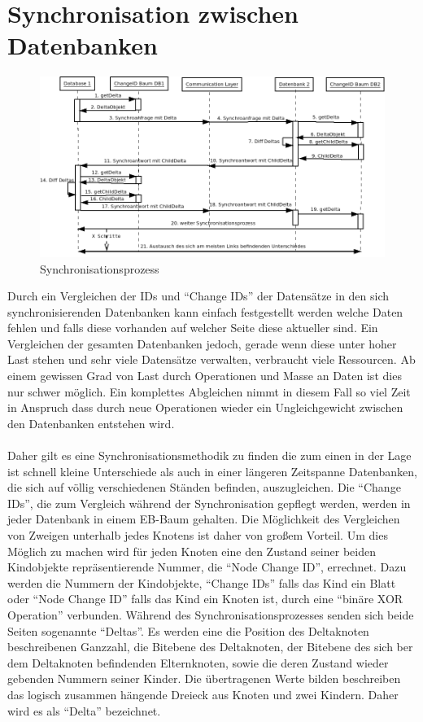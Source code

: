 \documentclass[a4paper,11pt,oneside,%
headsepline,												%
footsepline,												%
bibtotocnumbered									%
]{scrreprt}
\begin{document}
\section{Synchronisation zwischen Datenbanken}
\label{sec:eBTreeSynchronisation}
\begin{figure}[h!]
 	\centering
    \includegraphics[width=1\textwidth]{bilder/SynchroProzess.png}
    \caption{Synchronisationsprozess}
\end{figure}
Durch ein Vergleichen der \ac{ID}s und \enquote{Change IDs} der Datensätze in den sich synchronisierenden Datenbanken kann einfach festgestellt werden welche Daten fehlen und falls diese vorhanden auf welcher Seite diese aktueller sind. Ein Vergleichen der gesamten Datenbanken jedoch, gerade wenn diese unter hoher Last stehen und sehr viele Datensätze verwalten, verbraucht viele Ressourcen. Ab einem gewissen Grad von Last durch Operationen und Masse an Daten ist dies nur schwer möglich. Ein komplettes Abgleichen nimmt in diesem Fall so viel Zeit in Anspruch dass durch neue Operationen wieder ein Ungleichgewicht zwischen den Datenbanken entstehen wird.\\\\
Daher gilt es eine Synchronisationsmethodik zu finden die zum einen in der Lage ist schnell kleine Unterschiede als auch in einer längeren Zeitspanne Datenbanken, die sich auf völlig verschiedenen Ständen befinden, auszugleichen.
Die \enquote{Change IDs}, die zum Vergleich während der Synchronisation gepflegt werden, werden in jeder Datenbank in einem \ac{EB-Baum} gehalten. Die Möglichkeit des Vergleichen von Zweigen unterhalb jedes Knotens ist daher von großem Vorteil. Um dies Möglich zu machen wird für jeden Knoten eine den Zustand seiner beiden Kindobjekte repräsentierende Nummer, die \enquote{Node Change ID}, errechnet. Dazu werden die Nummern der Kindobjekte, \enquote{Change IDs} falls das Kind ein Blatt oder \enquote{Node Change ID} falls das Kind ein Knoten ist, durch eine \enquote{binäre XOR Operation} verbunden. Während des Synchronisationsprozesses senden sich beide Seiten sogenannte \enquote{Deltas}. Es werden eine die Position des Deltaknoten beschreibenen Ganzzahl, die Bitebene des  Deltaknoten, der Bitebene des sich ber dem Deltaknoten befindenden Elternknoten, sowie die deren Zustand wieder gebenden Nummern seiner Kinder. Die übertragenen Werte bilden beschreiben das logisch zusammen hängende Dreieck aus Knoten und zwei Kindern. Daher wird es als \enquote{Delta} bezeichnet.\\
\end{document}
